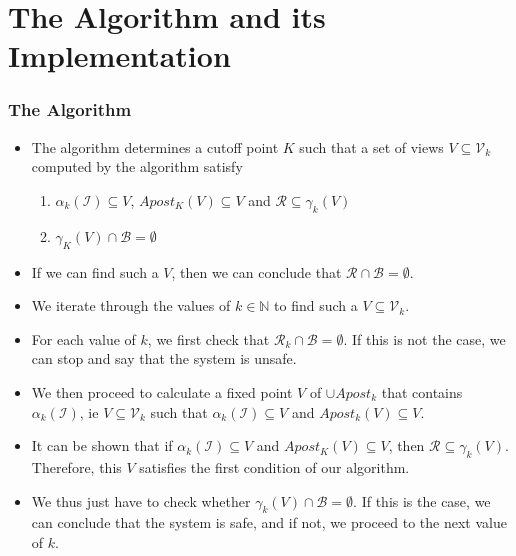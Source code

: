 \documentclass{beamer}
\begin{document}
    \section{The Algorithm and its Implementation}
    {
        \begin{frame}
            \frametitle{The Algorithm}
            \begin{itemize}
                \item The algorithm determines a cutoff point $K$ such that a set of views $V \subseteq \mathcal{V}_{k}$ computed by the algorithm satisfy
                \begin{enumerate}
                    \item $\alpha_{k}(\mathcal{I}) \subseteq V$, $Apost_{K}(V) \subseteq V$ and $\mathcal{R} \subseteq \gamma_{k}(V)$
                    \item $\gamma_{K}(V) \cap \mathcal{B} = \emptyset$
                \end{enumerate}
                \item If we can find such a $V$, then we can conclude that $\mathcal{R} \cap \mathcal{B} = \emptyset$.
                \item We iterate through the values of $k \in \mathbb{N}$ to find such a $V \subseteq \mathcal{V}_{k}$.
                \item For each value of $k$, we first check that $\mathcal{R}_{k} \cap \mathcal{B} = \emptyset$. If this is not the case, we can stop and say that the system is unsafe.
                \item We then proceed to calculate a fixed point $V$ of $\cup Apost_{k}$ that contains $\alpha_{k}(\mathcal{I})$, ie $V \subseteq \mathcal{V}_{k}$ such that $\alpha_{k}(\mathcal{I}) \subseteq V$ and $Apost_{k}(V) \subseteq V$.
                \item It can be shown that if $\alpha_{k}(\mathcal{I}) \subseteq V$ and $Apost_{K}(V) \subseteq V$, then $\mathcal{R} \subseteq \gamma_{k}(V)$. Therefore, this $V$ satisfies the first condition of our algorithm.
                \item We thus just have to check whether $\gamma_{k}(V) \cap \mathcal{B} = \emptyset$. If this is the case, we can conclude that the system is safe, and if not, we proceed to the next value of $k$.
            \end{itemize}
        \end{frame}

}
\end{document}
